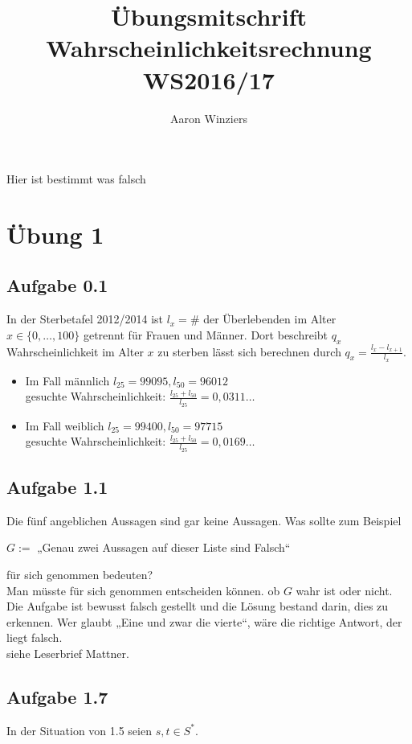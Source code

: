 \documentclass[10pt, a4paper]{article}
\author{Aaron Winziers}
\title{Übungsmitschrift Wahrscheinlichkeitsrechnung WS2016/17}
\begin{document}
\maketitle
\begin{center}
	\large\color{red} Hier ist bestimmt was falsch
\end{center}
\tableofcontents

\section{Übung 1}
\subsection{Aufgabe 0.1}
In der Sterbetafel 2012/2014 ist $l_{x}=\#$ der Überlebenden im Alter $x\in\{0,\dots,100\}$ getrennt für Frauen und Männer. Dort beschreibt $q_{x}$ Wahrscheinlichkeit im Alter $x$ zu sterben lässt sich berechnen durch $q_{x}=\frac{l_{x}-l_{x+1}}{l_{x}}$.
\begin{itemize}
	\item Im Fall männlich $l_{25}=99095, l_{50}=96012$	\\ gesuchte Wahrscheinlichkeit: $\frac{l_{25}+l_{50}}{l_{25}}=0,0311\dots$
	\item Im Fall weiblich $l_{25}=99400, l_{50}=97715$	\\ gesuchte Wahrscheinlichkeit: $\frac{l_{25}+l_{50}}{l_{25}}=0,0169\dots$
\end{itemize}


\subsection{Aufgabe 1.1}
Die fünf angeblichen Aussagen sind gar keine Aussagen. Was sollte zum Beispiel
\begin{center}
	$G:=$ „Genau zwei Aussagen auf dieser Liste sind Falsch“
\end{center}
für sich genommen bedeuten?	\\
Man müsste für sich genommen entscheiden können. ob $G$ wahr ist oder nicht. 
Die Aufgabe ist bewusst falsch gestellt und die Lösung bestand darin, dies zu erkennen. Wer glaubt „Eine und zwar die vierte“, wäre die richtige Antwort, der liegt falsch.	\\
siehe Leserbrief Mattner.


\subsection{Aufgabe 1.7}
In der Situation von 1.5 seien $s,t\in S^{*}$.
\end{document}
